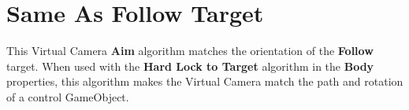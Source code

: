 \chapter{Same As Follow Target}
\hypertarget{md__hey_tea_9_2_library_2_package_cache_2com_8unity_8cinemachine_0d2_89_87_2_documentation_0i_2_cinemachine_aim_same_as_follow}{}\label{md__hey_tea_9_2_library_2_package_cache_2com_8unity_8cinemachine_0d2_89_87_2_documentation_0i_2_cinemachine_aim_same_as_follow}
\label{md__hey_tea_9_2_library_2_package_cache_2com_8unity_8cinemachine_0d2_89_87_2_documentation_0i_2_cinemachine_aim_same_as_follow_autotoc_md496}%
%
 This Virtual Camera {\bfseries{Aim}} algorithm matches the orientation of the {\bfseries{Follow}} target. When used with the {\bfseries{Hard Lock to Target}} algorithm in the {\bfseries{Body}} properties, this algorithm makes the Virtual Camera match the path and rotation of a control Game\+Object. 